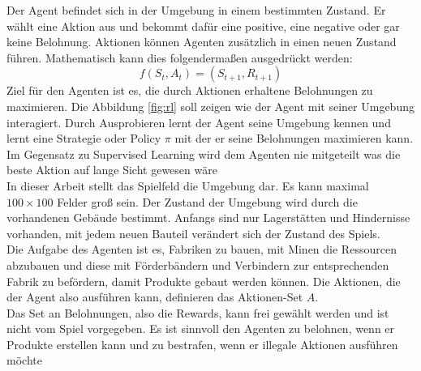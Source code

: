Der Agent befindet sich in der Umgebung in einem bestimmten Zustand. Er wählt eine Aktion aus und bekommt dafür eine positive, eine negative oder gar keine Belohnung. Aktionen können Agenten zusätzlich in einen neuen Zustand führen. Mathematisch kann dies folgendermaßen ausgedrückt werden:
\begin{equation}
	f(S_t,A_t)= (S_{t+1},R_{t+1})
\end{equation}
Ziel für den Agenten ist es, die durch Aktionen erhaltene Belohnungen zu maximieren. Die Abbildung \ref{fig:rl} soll zeigen wie der Agent mit seiner Umgebung interagiert.
Durch Ausprobieren lernt der Agent seine Umgebung kennen und lernt eine Strategie oder Policy $\pi$ mit der er seine Belohnungen maximieren kann. Im Gegensatz zu Supervised Learning wird dem Agenten nie mitgeteilt was die beste Aktion auf lange Sicht gewesen wäre  
\\
In dieser Arbeit stellt das Spielfeld die Umgebung dar. Es kann maximal $100\times100$ Felder groß sein. Der Zustand der Umgebung wird durch die vorhandenen Gebäude  bestimmt. Anfangs sind nur Lagerstätten und Hindernisse vorhanden, mit jedem neuen Bauteil verändert sich der Zustand des Spiels.
\\
Die Aufgabe des Agenten ist es, Fabriken zu bauen, mit Minen die Ressourcen abzubauen und diese mit Förderbändern und Verbindern zur entsprechenden Fabrik zu befördern, damit Produkte gebaut werden können.
Die Aktionen, die der Agent also ausführen kann, definieren das Aktionen-Set $A$.
\\
Das Set an Belohnungen, also die Rewards, kann frei gewählt werden und ist nicht vom Spiel vorgegeben. Es ist sinnvoll den Agenten zu belohnen, wenn er Produkte erstellen kann und zu bestrafen, wenn er illegale Aktionen ausführen möchte


